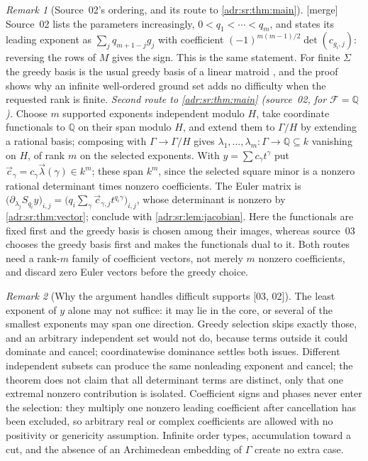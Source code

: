 \documentclass[11pt,letterpaper]{article}
\numberwithin{equation}{section}
\theoremstyle{definition}
\theoremstyle{remark}
\newtheorem{remark}[remark]{Remark}
\newcommand{\Q}{\mathbb Q}
\newcommand{\mtag}{\textup{[merge]}}%
\newcommand{\src}[1]{\textup{[#1]}}%
\begin{document}
\begin{remark}[Source~02's ordering, and its route to \cref{adr:sr:thm:main}]
\label{adr:sr:rem:ascending}
\mtag{} Source~02 lists the parameters increasingly, $0<q_1<\cdots<q_m$, and
states its leading exponent as $\sum_jq_{m+1-j}g_j$ with coefficient
$(-1)^{m(m-1)/2}\det(c_{g_i,j})$: reversing the rows of $M$ gives the sign.
This is the same statement. For finite $\Sigma$ the greedy basis is the usual
greedy basis of a linear matroid \cite{Edmonds}, and the proof shows why an
infinite well-ordered ground set adds no difficulty when the requested rank is
finite. \emph{Second route to \cref{adr:sr:thm:main} (source~02, for
$\mathcal F=\Q$).} Choose $m$ supported exponents independent modulo $H$, take
coordinate functionals to $\Q$ on their span modulo $H$, and extend them to
$\Gamma/H$ by extending a rational basis; composing with $\Gamma\to\Gamma/H$
gives $\lambda_1,\ldots,\lambda_m:\Gamma\to\Q\subseteq k$ vanishing on $H$,
of rank $m$ on the selected exponents. With $y=\sum c_\gamma t^\gamma$ put
$\vec c_\gamma=c_\gamma\vec\lambda(\gamma)\in k^m$; these span $k^m$, since the
selected square minor is a nonzero rational determinant times nonzero
coefficients. The Euler matrix is
$\bigl(\partial_{\lambda_j}S_{q_i}y\bigr)_{i,j}
=\bigl(q_i\sum_\gamma\vec c_{\gamma,j}t^{q_i\gamma}\bigr)_{i,j}$, whose
determinant is nonzero by \cref{adr:sr:thm:vector}; conclude with
\cref{adr:sr:lem:jacobian}. Here the functionals are fixed first and the
greedy basis is chosen among their images, whereas source~03 chooses the greedy
basis first and makes the functionals dual to it. Both routes need a rank-$m$
family of coefficient vectors, not merely $m$ nonzero coefficients, and
discard zero Euler vectors before the greedy choice.
\end{remark}

\begin{remark}[Why the argument handles difficult supports \src{03, 02}]
The least exponent of $y$ alone may not suffice: it may lie in the core, or
several of the smallest exponents may span one direction. Greedy selection
skips exactly those, and an arbitrary independent set would not do, because
terms outside it could dominate and cancel; coordinatewise dominance settles
both issues. Different independent subsets can produce the same nonleading
exponent and cancel; the theorem does not claim that all determinant terms are
distinct, only that one extremal nonzero contribution is isolated. Coefficient
signs and phases never enter the selection: they multiply one nonzero leading
coefficient after cancellation has been excluded, so arbitrary real or complex
coefficients are allowed with no positivity or genericity assumption.
Infinite order types, accumulation toward a cut, and the absence of an
Archimedean embedding of $\Gamma$ create no extra case.
\end{remark}
\end{document}
